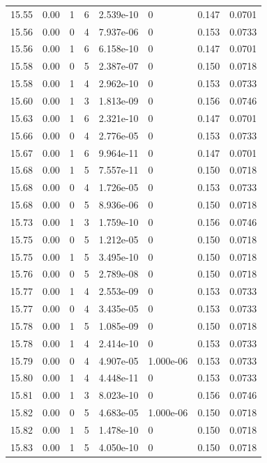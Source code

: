 \documentclass[preview]{standalone}
\begin{document}
{{{{{{{{{{{{{{{\begin{tabular}{L{1.2cm}C{1.2cm} C{0.3cm}C{0.5cm} C{1.4cm}C{1.4cm} C{1.4cm}C{1.4cm}}
  15.55  &  0.00  & 1     &  6 &  2.539e-10  & 0  & 0.147 &  0.0701   \\ 
  15.56  &  0.00  & 0     &  4 &  7.937e-06  & 0  & 0.153 &  0.0733   \\ 
  15.56  &  0.00  & 1     &  6 &  6.158e-10  & 0  & 0.147 &  0.0701   \\ 
  15.58  &  0.00  & 0     &  5 &  2.387e-07  & 0  & 0.150 &  0.0718   \\ 
  15.58  &  0.00  & 1     &  4 &  2.962e-10  & 0  & 0.153 &  0.0733   \\ 
  15.60  &  0.00  & 1     &  3 &  1.813e-09  & 0  & 0.156 &  0.0746   \\ 
  15.63  &  0.00  & 1     &  6 &  2.321e-10  & 0  & 0.147 &  0.0701   \\ 
  15.66  &  0.00  & 0     &  4 &  2.776e-05  & 0  & 0.153 &  0.0733   \\ 
  15.67  &  0.00  & 1     &  6 &  9.964e-11  & 0  & 0.147 &  0.0701   \\ 
  15.68  &  0.00  & 1     &  5 &  7.557e-11  & 0  & 0.150 &  0.0718   \\ 
  15.68  &  0.00  & 0     &  4 &  1.726e-05  & 0  & 0.153 &  0.0733   \\ 
  15.68  &  0.00  & 0     &  5 &  8.936e-06  & 0  & 0.150 &  0.0718   \\ 
  15.73  &  0.00  & 1     &  3 &  1.759e-10  & 0  & 0.156 &  0.0746   \\ 
  15.75  &  0.00  & 0     &  5 &  1.212e-05  & 0  & 0.150 &  0.0718   \\ 
  15.75  &  0.00  & 1     &  5 &  3.495e-10  & 0  & 0.150 &  0.0718   \\ 
  15.76  &  0.00  & 0     &  5 &  2.789e-08  & 0  & 0.150 &  0.0718   \\ 
  15.77  &  0.00  & 1     &  4 &  2.553e-09  & 0  & 0.153 &  0.0733   \\ 
  15.77  &  0.00  & 0     &  4 &  3.435e-05  & 0  & 0.153 &  0.0733   \\ 
  15.78  &  0.00  & 1     &  5 &  1.085e-09  & 0  & 0.150 &  0.0718   \\ 
  15.78  &  0.00  & 1     &  4 &  2.414e-10  & 0  & 0.153 &  0.0733   \\ 
  15.79  &  0.00  & 0     &  4 &  4.907e-05  & 1.000e-06  & 0.153 &  0.0733   \\ 
  15.80  &  0.00  & 1     &  4 &  4.448e-11  & 0  & 0.153 &  0.0733   \\ 
  15.81  &  0.00  & 1     &  3 &  8.023e-10  & 0  & 0.156 &  0.0746   \\ 
  15.82  &  0.00  & 0     &  5 &  4.683e-05  & 1.000e-06  & 0.150 &  0.0718   \\ 
  15.82  &  0.00  & 1     &  5 &  1.478e-10  & 0  & 0.150 &  0.0718   \\ 
  15.83  &  0.00  & 1     &  5 &  4.050e-10  & 0  & 0.150 &  0.0718   \\ 
\hline 
\end{tabular} 

}}}}}}}}}}}}}}}
\end{document}
